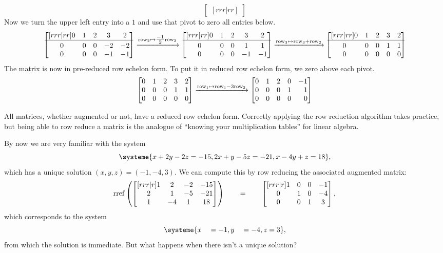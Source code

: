 \begin{example}
\[\begin{bmatrix}[rrr|rr]
		\end{bmatrix}
		\]
		Now we turn the upper left entry into a $1$ and use that pivot
		to zero all entries below.
		\[
		\begin{bmatrix}[rrr|rr]
			0&1&2&3&2\\
			\hline\\[\dimexpr-\normalbaselineskip+2pt]
			0&0&0&-2&-2\\0&0&0&-1&-1
		\end{bmatrix}
		\xrightarrow{\text{row}_2\mapsto\tfrac{-1}{2}\text{row}_2}
		\begin{bmatrix}[rrr|rr]
			0&1&2&3&2\\
			\hline\\[\dimexpr-\normalbaselineskip+2pt]
			0&0&0&1&1\\0&0&0&-1&-1
		\end{bmatrix}
		\xrightarrow{\text{row}_3\mapsto\text{row}_3+\text{row}_2}
		\begin{bmatrix}[rrr|rr]
			0&1&2&3&2\\
			\hline\\[\dimexpr-\normalbaselineskip+2pt]
			0&0&0&1&1\\0&0&0&0&0
		\end{bmatrix}
		\]
		The matrix is now in pre-reduced row echelon form. To put it in reduced row echelon
		form, we zero above each pivot.
		\[
			\mat{
				0&1&2&3&2\\
				0&0&0&1&1\\0&0&0&0&0
			}
			\xrightarrow{\text{row}_1\mapsto\text{row}_1-3\text{row}_2}
			\mat{
				0&1&2&0&-1\\
				0&0&0&1&1\\0&0&0&0&0
			}
		\]
	\end{example}

	All matrices, whether augmented or not, have a reduced row echelon form. 
	Correctly applying the row reduction algorithm takes practice,
	but being able to row reduce a matrix is the analogue of ``knowing your multiplication tables'' for
	linear algebra.


	
	By now we are very familiar with the system
	\[
			\systeme{
				x+2y-2z=-15,
				2x+y-5z=-21,
				x-4y+z=18
			},
	\]
	which has a unique solution $(x,y,z)=(-1,-4,3)$. 
	We can compute this by row reducing the associated augmented matrix:
	\[
		\operatorname{rref}\left(\begin{bmatrix}[rrr|r]
				1&2&-2 & -15\\
				2&1&-5&-21\\
				1&-4&1&18
		\end{bmatrix}\right)
			\qquad=\qquad
			\begin{bmatrix}[rrr|r]
				1&0&0 & -1\\
				0&1&0&-4\\
				0&0&1&3
			\end{bmatrix},
	\]
	which corresponds to the system
	\[
			\systeme{
				x\quad =-1,y\quad =-4,z=3
			},
	\]
	from which the solution is immediate. But what happens when there isn't a 
	unique solution?

